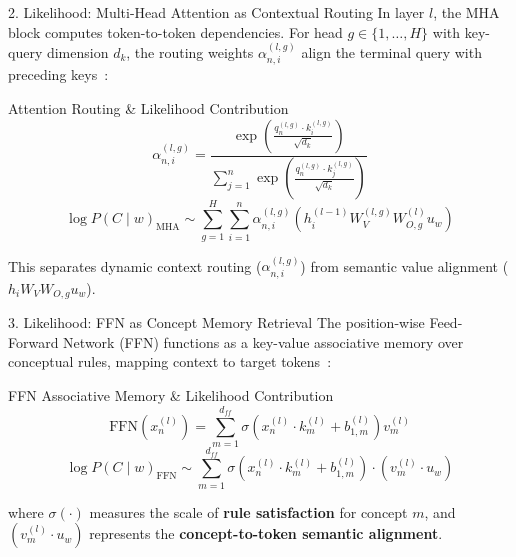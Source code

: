 \documentclass[aspectratio=169, 11pt]{beamer}
\begin{document}
\begin{frame}{2. Likelihood: Multi-Head Attention as Contextual Routing}
    In layer $l$, the MHA block computes token-to-token dependencies. For head $g \in \{1,\dots,H\}$ with key-query dimension $d_k$, the routing weights $\alpha_{n,i}^{(l,g)}$ align the terminal query with preceding keys~\cite{vaswani2017attention}:
    \begin{block}{Attention Routing \& Likelihood Contribution}
        $$\alpha_{n,i}^{(l,g)} = \frac{\exp\left(\frac{q_n^{(l,g)} \cdot k_i^{(l,g)}}{\sqrt{d_k}}\right)}{\sum_{j=1}^n \exp\left(\frac{q_n^{(l,g)} \cdot k_j^{(l,g)}}{\sqrt{d_k}}\right)}$$
        $$\log P(C \mid w)_{\text{MHA}} \sim \sum_{g=1}^H \sum_{i=1}^n \alpha_{n,i}^{(l,g)} \left( h_i^{(l-1)} W_V^{(l,g)} W_{O,g}^{(l)} u_w \right)$$
    \end{block}
    This separates dynamic context routing ($\alpha_{n,i}^{(l,g)}$) from semantic value alignment ($h_i W_V W_{O,g} u_w$).
\end{frame}

\begin{frame}{3. Likelihood: FFN as Concept Memory Retrieval}
    The position-wise Feed-Forward Network (FFN) functions as a key-value associative memory over conceptual rules, mapping context to target tokens~\cite{geva-etal-2021-transformer}:
    \begin{block}{FFN Associative Memory \& Likelihood Contribution}
        $$\text{FFN}(x_n^{(l)}) = \sum_{m=1}^{d_{ff}} \sigma\left( x_n^{(l)} \cdot k_m^{(l)} + b_{1,m}^{(l)} \right) v_m^{(l)}$$
        $$\log P(C \mid w)_{\text{FFN}} \sim \sum_{m=1}^{d_{ff}} \sigma\left( x_n^{(l)} \cdot k_m^{(l)} + b_{1,m}^{(l)} \right) \cdot (v_m^{(l)} \cdot u_w)$$
    \end{block}
    where $\sigma(\cdot)$ measures the scale of \textbf{rule satisfaction} for concept $m$, and $(v_m^{(l)} \cdot u_w)$ represents the \textbf{concept-to-token semantic alignment}.
\end{frame}
\end{document}
